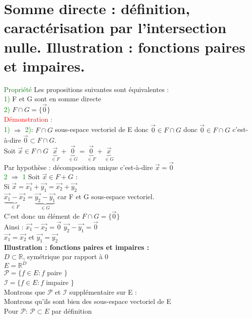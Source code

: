 \documentclass{article}
\begin{document}
\section{Somme directe : définition, caractérisation par l'intersection nulle. Illustration : fonctions paires et impaires.}
\textcolor{green}{Propriété} Les propositions suivantes sont équivalentes : \\ 
\textcolor{green}{1)} F et G sont en somme directe \\ 
\textcolor{green}{2)} $F\cap G =\lbrace \vec{0} \rbrace$ \\ 
\textcolor{red}{Démonstration :} \\ 
\textcolor{green}{1)} $\Rightarrow$ \textcolor{green}{2)}: $F \cap G$ sous-espace vectoriel de E donc $\vec{0} \in F \cap G$ donc $\vec{0} \in F \cap G$ c'est-à-dire $\vec{0} \subset F \cap G$. \\ 
Soit $\vec{x} \in F \cap G$  $\underbrace{\vec{x}}_{\in F} + \underbrace{\vec{0}}_{\in G}= \underbrace{\vec{0}}_{\in F}+\underbrace{\vec{x}}_{\in G}$ \\ 
Par hypothèse : décomposition unique c'est-à-dire $\vec{x}= \vec{0}$ \\ 
\textcolor{green}{2} $\Rightarrow$ \textcolor{green}{1} Soit $\vec{x} \in F + G$ : \\ 
Si $\vec{x}= \vec{x_1}+\vec{y_1} =\vec{x_2} +\vec{y_2}$ \\ 
$\underbrace{\vec{x_1}-\vec{x_2}}_{\in F} = \underbrace{\vec{y_2}-\vec{y_1}}_{\in G}$ car F et G  sous-espace vectoriel. \\ 
C'est donc un élément de $F \cap G = \lbrace \vec{0} \rbrace$ \\ 
Ainsi : $\vec{x_1}-\vec{x_2}=\vec{0}$ $\vec{y_2}-\vec{y_1}=\vec{0}$ \\ 
$\vec{x_1}=\vec{x_2}$ et $\vec{y_1}=\vec{y_2}$ \\ 
{\bf Illustration : fonctions paires et impaires :} \\ 
$D \subset \mathbb{R}$, symétrique par rapport à 0 \\ 
$E=\mathbb{R}^D$ \\ 
$\mathcal{P}=\lbrace f \in E : f$ paire $\rbrace$ \\ 
$\mathcal{I}=\lbrace f \in E : f$ impaire $\rbrace$ \\ 
Montrons que $\mathcal{P}$ et $\mathcal{I}$ supplémentaire sur E : \\ 
Montrons qu'ils sont bien des sous-espace vectoriel de E \\ 
Pour $\mathcal{P}$: $\mathcal{P} \subset E$ par définition \\ 
\end{document}

